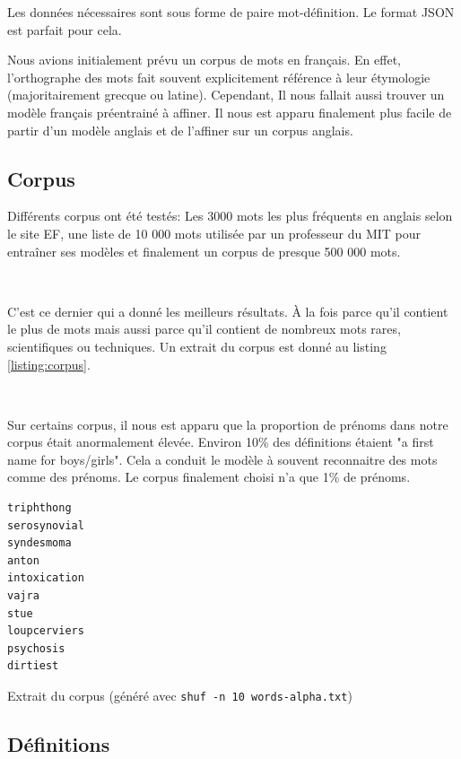 \documentclass[french]{template}
\begin{document}
Les données nécessaires sont sous forme de paire mot-définition. Le format JSON est parfait pour cela.

Nous avions initialement prévu un corpus de mots en français. En effet, l'orthographe des mots fait souvent explicitement référence à leur étymologie (majoritairement grecque ou latine). Cependant, Il nous fallait aussi trouver un modèle français préentrainé à affiner. Il nous est apparu finalement plus facile de partir d'un modèle anglais et de l'affiner sur un corpus anglais.

\subsection{Corpus}

Différents corpus ont été testés: Les 3000 mots les plus fréquents en anglais selon le site EF, une liste de 10 000 mots utilisée par un professeur du MIT pour entraîner ses modèles et finalement un corpus de presque 500 000 mots.

\

C'est ce dernier qui a donné les meilleurs résultats. À la fois parce qu'il contient le plus de mots mais aussi parce qu'il contient de nombreux mots rares, scientifiques ou techniques. Un extrait du corpus est donné au listing \ref{listing:corpus}.

\

Sur certains corpus, il nous est apparu que la proportion de prénoms dans notre corpus était anormalement élevée. Environ 10\% des définitions étaient "a first name for boys/girls". Cela a conduit le modèle à souvent reconnaitre des mots comme des prénoms. Le corpus finalement choisi n'a que 1\% de prénoms.

\begin{listing}[H]
    \begin{verbatim}
triphthong
serosynovial
syndesmoma
anton
intoxication
vajra
stue
loupcerviers
psychosis
dirtiest
\end{verbatim}
    \caption{Extrait du corpus (généré avec \texttt{shuf -n 10 words-alpha.txt})}
    \label{listing:corpus}
\end{listing}

\subsection{Définitions}
\end{document}
